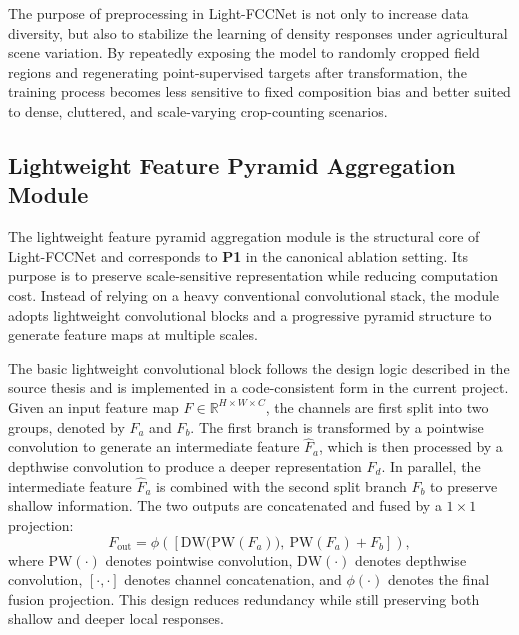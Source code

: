 \documentclass[a4paper,fleqn]{cas-sc}
\begin{document}
The purpose of preprocessing in Light-FCCNet is not only to increase data diversity, but also to stabilize the learning of density responses under agricultural scene variation. By repeatedly exposing the model to randomly cropped field regions and regenerating point-supervised targets after transformation, the training process becomes less sensitive to fixed composition bias and better suited to dense, cluttered, and scale-varying crop-counting scenarios.

\subsection{Lightweight Feature Pyramid Aggregation Module}

The lightweight feature pyramid aggregation module is the structural core of Light-FCCNet and corresponds to \textbf{P1} in the canonical ablation setting. Its purpose is to preserve scale-sensitive representation while reducing computation cost. Instead of relying on a heavy conventional convolutional stack, the module adopts lightweight convolutional blocks and a progressive pyramid structure to generate feature maps at multiple scales.

The basic lightweight convolutional block follows the design logic described in the source thesis and is implemented in a code-consistent form in the current project. Given an input feature map $F \in \mathbb{R}^{H \times W \times C}$, the channels are first split into two groups, denoted by $F_a$ and $F_b$. The first branch is transformed by a pointwise convolution to generate an intermediate feature $\hat{F}_a$, which is then processed by a depthwise convolution to produce a deeper representation $F_d$. In parallel, the intermediate feature $\hat{F}_a$ is combined with the second split branch $F_b$ to preserve shallow information. The two outputs are concatenated and fused by a $1 \times 1$ projection:
\begin{equation}
    F_{\mathrm{out}} = \phi \left( \left[ \mathrm{DW}\big(\mathrm{PW}(F_a)\big),\ \mathrm{PW}(F_a) + F_b \right] \right),
\end{equation}
where $\mathrm{PW}(\cdot)$ denotes pointwise convolution, $\mathrm{DW}(\cdot)$ denotes depthwise convolution, $[\cdot,\cdot]$ denotes channel concatenation, and $\phi(\cdot)$ denotes the final fusion projection. This design reduces redundancy while still preserving both shallow and deeper local responses.
\end{document}
